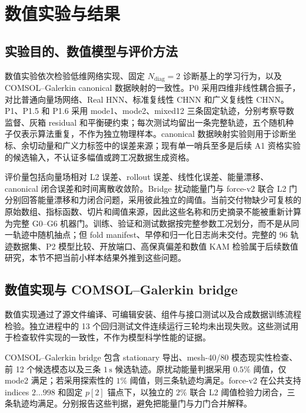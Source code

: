 \section{数值实验与结果}\label{sec:numerical-results}

\subsection{实验目的、数值模型与评价方法}\label{sec:numerical-6-1}

数值实验依次检验低维网络实现、固定 \(N_{\mathrm{diag}}=2\) 诊断基上的学习行为，以及 COMSOL--Galerkin canonical 数据映射的一致性。P0 采用四维非线性耦合振子，对比普通向量场网络、Real HNN、标准复线性 CHNN 和广义复线性 CHNN。P1、P1.5 和 P1.6 采用 mode1、mode2、mixed12 三条固定轨迹，分别考察导数监督、灰箱 residual 和平衡硬约束；每次测试均留出一条完整轨迹，五个随机种子仅表示算法重复，不作为独立物理样本。canonical 数据映射实验则用于诊断坐标、余切动量和广义力标签中的误差来源；现有单一哨兵至多是后续 A1 资格实验的候选输入，不认证多幅值或跨工况数据生成资格。

评价量包括向量场相对 L2 误差、rollout 误差、线性化误差、能量漂移、canonical 闭合误差和时间离散收敛阶。Bridge 扰动能量门与 force-v2 联合 L2 门分别回答能量漂移和力闭合问题，采用彼此独立的阈值。当前交付物缺少可复核的原始数组、指标函数、切片和阈值来源，因此这些名称和历史摘录不能被重新计算为完整 G0--G6 机器门。训练、验证和测试数据按完整参数工况划分，而不是从同一轨迹中随机抽点；但 fold manifest、早停和归一化日志尚未交付。完整的 96 轨迹数据集、P2 模型比较、开放端口、高保真偏差和数值 KAM 检验属于后续数值研究，本节不把当前小样本结果外推到这些问题。

\subsection{数值实现与 COMSOL--Galerkin bridge}\label{sec:numerical-6-2}

数值实现通过了源文件编译、可编辑安装、组件与接口测试以及合成数据训练流程检验。独立进程中的 13 个回归测试文件连续运行三轮均未出现失败。这些测试用于检查软件实现的一致性，不作为模型科学性能的证据。

COMSOL--Galerkin bridge 包含 stationary 导出、mesh-40/80 模态现实性检查、前 12 个候选模态以及三条 \(1\,\mathrm{s}\) 候选轨迹。原扰动能量判据采用 \(0.5\%\) 阈值，仅 mode2 满足；若采用探索性的 \(1\%\) 阈值，则三条轨迹均满足。force-v2 在公共支持 indices \(2\ldots998\) 和固定 \(p[2]\) 锚点下，以独立的 \(2\%\) 联合 L2 阈值检验力闭合，三条轨迹均满足。分别报告这些判据，避免把能量门与力门合并解释。

